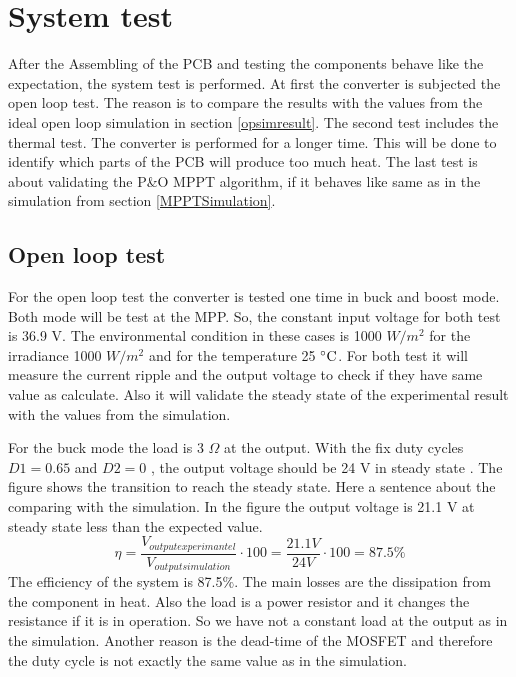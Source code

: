 \section{System test}
After the Assembling of the PCB and testing the components behave like the expectation, the system test is performed. At first the converter is subjected the open loop test. The reason is to compare the results with the values from the ideal open loop simulation in section \ref{opsimresult}. The second test includes the thermal test. The converter is performed for a longer time. This will be done to identify which parts of the PCB will produce too much heat. The last test is about validating the P\&O MPPT algorithm, if it behaves like same as in the simulation from section \ref{MPPTSimulation}.

\subsection{Open loop test}
For the open loop test the converter is tested one time in buck and boost mode. Both mode will be test at the MPP. So, the constant input voltage for both test is 36.9 V. The environmental condition in these cases is 1000 $W /m^2$ for the irradiance 1000 $W /m^2$ and for the temperature 25 $\decC$. For both test it will measure the current ripple and the output voltage to check if they have same value as calculate. Also it will validate the steady state of the experimental result with the values from the simulation.

For the buck mode the load is 3 $\Omega$ at the output. With the fix duty cycles $D1 = 0.65$ and  $D2 = 0$ , the output voltage should be 24 V in steady state . The figure shows the transition to reach the steady state. Here a sentence about the comparing with the simulation.  In the figure the output voltage is 21.1 V  at steady state less than the expected value.
\begin{equation}\label{effiencybuckmode}
\eta = \frac{V_{outputexperimantel}}{V_{output simulation}} \cdot 100 = \frac{21.1V}{24V} \cdot 100 = 87.5 \%
\end{equation}
The efficiency of the system is 87.5$\%$. The main losses are the dissipation from the component in heat. Also the load is a power resistor and it changes the resistance if it is in operation. So we have not a constant load at the output as in the simulation. Another reason is the dead-time of the MOSFET and therefore the duty cycle is not exactly the same value as in the simulation. 

